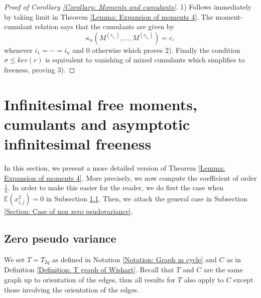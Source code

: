\documentclass{article}
\newtheorem{corollary}  [theorem]{Corollary}
\theoremstyle{definition}
\newcommand{\NC}{\mathcal{NC}}
\begin{document}
{%
\begin{proof}[Proof of Corollary \ref{Corollary: Moments and cumulants}]
1) Follows immediately by taking limit in Theorem \ref{Lemma: Expansion of moments 4}. The moment-cumulant relation says that the cumulants are given by 
$$\kappa_n(M^{(r_{i_1})},\dots,M^{(r_{i_n})})=c,$$
whenever $i_1 =\cdots =i_n$ and $0$ otherwise which proves 2). Finally the condition $\sigma \leq ker(r)$ is equivalent to vanishing of mixed cumulants which simplifies to freeness, proving 3).
\end{proof}

\section{Infinitesimal free moments, cumulants and asymptotic infinitesimal freeness}\label{Section: Infinitesimal moments}

In this section, we present a more detailed version of Theorem \ref{Lemma: Expansion of moments 4}. More precisely, we now compute the coefficient of order $\frac{1}{n}$. In order to make this easier for the reader, we do first the case when $\mathbb{E}(x_{i,j}^2)=0$ in Subsection \ref{Section: zero pseudo variance}. Then, we attack the general case in Subsection \ref{Section: Case of non zero psudovariance}.

\subsection{Zero pseudo variance}\label{Section: zero pseudo variance}
We set $T=T_{2q}$ as defined in Notation \ref{Notation: Graph m cycle} and $C$ as in Definition \ref{Definition: T graph of Wishart}. Recall that $T$ and $C$ are the same graph up to orientation of the edges, thus all results for $T$ also apply to $C$ except those involving the orientation of the edges.

}
\end{document}
